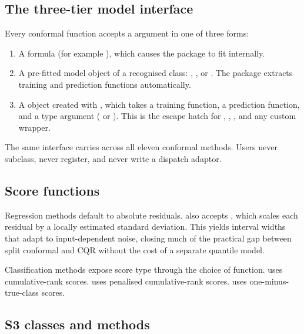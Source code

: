 \subsection{The three-tier model interface}\label{the-three-tier-model-interface}

Every conformal function accepts a  argument in one of three
forms:

\begin{enumerate}
\def\labelenumi{\arabic{enumi}.}
\tightlist
\item
  A formula (for example ), which causes the package to fit
   internally.
\item
  A pre-fitted model object of a recognised class: , ,
  or . The package extracts training and prediction
  functions automatically.
\item
  A  object created with , which
  takes a training function, a prediction function, and a type argument
  ( or ). This is the escape hatch
  for , , , and any custom wrapper.
\end{enumerate}

The same interface carries across all eleven conformal methods. Users never
subclass, never register, and never write a dispatch adaptor.

\subsection{Score functions}\label{score-functions}

Regression methods default to absolute residuals. 
also accepts , which scales each residual
by a locally estimated standard deviation. This yields interval widths that
adapt to input-dependent noise, closing much of the practical gap between
split conformal and CQR without the cost of a separate quantile model.

Classification methods expose score type through the choice of
function.  uses cumulative-rank scores.
 uses penalised cumulative-rank scores.
 uses one-minus-true-class scores.

\subsection{S3 classes and methods}\label{s3-classes-and-methods}

